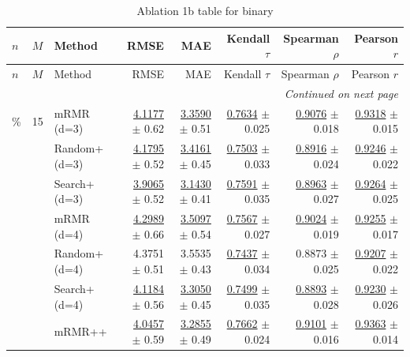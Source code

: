 \footnotesize
\setlength{\tabcolsep}{2pt}
\renewcommand{\arraystretch}{1.05}
\setlength{\LTpre}{0pt}
\setlength{\LTpost}{0pt}
\setlength{\LTleft}{\fill}
\setlength{\LTright}{\fill}
\begin{longtable}{llp{}rrrrr}
\caption{Ablation 1b table for binary}\label{tab:ablation\_1b\_binary}\\
\toprule
$n$ & $M$ & Method & RMSE & MAE & Kendall $\tau$ & Spearman $\rho$ & Pearson $r$ \\
\midrule
\endfirsthead
\toprule
$n$ & $M$ & Method & RMSE & MAE & Kendall $\tau$ & Spearman $\rho$ & Pearson $r$ \\
\midrule
\endhead
\midrule
\multicolumn{8}{r}{\emph{Continued on next page}} \\
\midrule
\endfoot
\bottomrule
\endlastfoot
5\% & 15 & mRMR (d=3) & \underline{4.1177} {\scriptsize $\pm$ 0.62} & \underline{3.3590} {\scriptsize $\pm$ 0.51} & \underline{0.7634} {\scriptsize $\pm$ 0.025} & \underline{0.9076} {\scriptsize $\pm$ 0.018} & \underline{0.9318} {\scriptsize $\pm$ 0.015} \\
 &  & Random+ (d=3) & \underline{4.1795} {\scriptsize $\pm$ 0.52} & \underline{3.4161} {\scriptsize $\pm$ 0.45} & \underline{0.7503} {\scriptsize $\pm$ 0.033} & \underline{0.8916} {\scriptsize $\pm$ 0.024} & \underline{0.9246} {\scriptsize $\pm$ 0.022} \\
 &  & Search+ (d=3) & \underline{3.9065} {\scriptsize $\pm$ 0.52} & \underline{3.1430} {\scriptsize $\pm$ 0.41} & \underline{0.7591} {\scriptsize $\pm$ 0.035} & \underline{0.8963} {\scriptsize $\pm$ 0.027} & \underline{0.9264} {\scriptsize $\pm$ 0.025} \\
 &  & mRMR (d=4) & \underline{4.2989} {\scriptsize $\pm$ 0.66} & \underline{3.5097} {\scriptsize $\pm$ 0.54} & \underline{0.7567} {\scriptsize $\pm$ 0.027} & \underline{0.9024} {\scriptsize $\pm$ 0.019} & \underline{0.9255} {\scriptsize $\pm$ 0.017} \\
 &  & Random+ (d=4) & 4.3751 {\scriptsize $\pm$ 0.51} & 3.5535 {\scriptsize $\pm$ 0.43} & \underline{0.7437} {\scriptsize $\pm$ 0.034} & 0.8873 {\scriptsize $\pm$ 0.025} & \underline{0.9207} {\scriptsize $\pm$ 0.022} \\
 &  & Search+ (d=4) & \underline{4.1184} {\scriptsize $\pm$ 0.56} & \underline{3.3050} {\scriptsize $\pm$ 0.45} & \underline{0.7499} {\scriptsize $\pm$ 0.035} & \underline{0.8893} {\scriptsize $\pm$ 0.028} & \underline{0.9230} {\scriptsize $\pm$ 0.026} \\
 &  & mRMR++ & \underline{4.0457} {\scriptsize $\pm$ 0.59} & \underline{3.2855} {\scriptsize $\pm$ 0.49} & \underline{0.7662} {\scriptsize $\pm$ 0.024} & \underline{0.9101} {\scriptsize $\pm$ 0.016} & \underline{0.9363} {\scriptsize $\pm$ 0.014} \\

\end{longtable}
